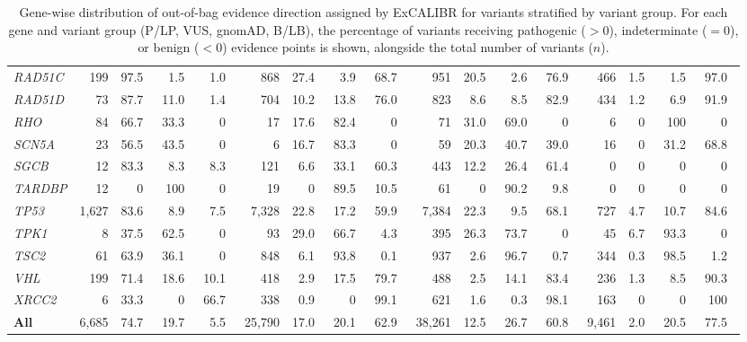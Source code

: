 \documentclass[11pt]{article}
\theoremstyle{plain}
\newcommand{\excalibr}{ExCALIBR\xspace}
\begin{document}
\begin{table}[!htb]
{{\begin{tabular}{@{}l rrrr rrrr rrrr rrrr@{}}
\textit{RAD51C} & 199 & 97.5\ & 1.5\ & 1.0\ & 868 & 27.4\ & 3.9\ & 68.7\ & 951 & 20.5\ & 2.6\ & 76.9\ & 466 & 1.5\ & 1.5\ & 97.0\ \\
\textit{RAD51D} & 73 & 87.7\ & 11.0\ & 1.4\ & 704 & 10.2\ & 13.8\ & 76.0\ & 823 & 8.6\ & 8.5\ & 82.9\ & 434 & 1.2\ & 6.9\ & 91.9\ \\
\textit{RHO} & 84 & 66.7\ & 33.3\ & 0\ & 17 & 17.6\ & 82.4\ & 0\ & 71 & 31.0\ & 69.0\ & 0\ & 6 & 0\ & 100\ & 0\ \\
\textit{SCN5A} & 23 & 56.5\ & 43.5\ & 0\ & 6 & 16.7\ & 83.3\ & 0\ & 59 & 20.3\ & 40.7\ & 39.0\ & 16 & 0\ & 31.2\ & 68.8\ \\
\textit{SGCB} & 12 & 83.3\ & 8.3\ & 8.3\ & 121 & 6.6\ & 33.1\ & 60.3\ & 443 & 12.2\ & 26.4\ & 61.4\ & 0 & 0\ & 0\ & 0\ \\
\textit{TARDBP} & 12 & 0\ & 100\ & 0\ & 19 & 0\ & 89.5\ & 10.5\ & 61 & 0\ & 90.2\ & 9.8\ & 0 & 0\ & 0\ & 0\ \\
\textit{TP53} & 1,627 & 83.6\ & 8.9\ & 7.5\ & 7,328 & 22.8\ & 17.2\ & 59.9\ & 7,384 & 22.3\ & 9.5\ & 68.1\ & 727 & 4.7\ & 10.7\ & 84.6\ \\
\textit{TPK1} & 8 & 37.5\ & 62.5\ & 0\ & 93 & 29.0\ & 66.7\ & 4.3\ & 395 & 26.3\ & 73.7\ & 0\ & 45 & 6.7\ & 93.3\ & 0\ \\
\textit{TSC2} & 61 & 63.9\ & 36.1\ & 0\ & 848 & 6.1\ & 93.8\ & 0.1\ & 937 & 2.6\ & 96.7\ & 0.7\ & 344 & 0.3\ & 98.5\ & 1.2\ \\
\textit{VHL} & 199 & 71.4\ & 18.6\ & 10.1\ & 418 & 2.9\ & 17.5\ & 79.7\ & 488 & 2.5\ & 14.1\ & 83.4\ & 236 & 1.3\ & 8.5\ & 90.3\ \\
\textit{XRCC2} & 6 & 33.3\ & 0\ & 66.7\ & 338 & 0.9\ & 0\ & 99.1\ & 621 & 1.6\ & 0.3\ & 98.1\ & 163 & 0\ & 0\ & 100\ \\
\midrule
\textbf{All} & 6,685 & 74.7\ & 19.7\ & 5.5\ & 25,790 & 17.0\ & 20.1\ & 62.9\ & 38,261 & 12.5\ & 26.7\ & 60.8\ & 9,461 & 2.0\ & 20.5\ & 77.5\ \\
\bottomrule
\end{tabular}}
}
\caption{Gene-wise distribution of out-of-bag evidence direction assigned by \excalibr for variants stratified by variant group. For each gene and variant group (P/LP, VUS, gnomAD, B/LB), the percentage of variants receiving pathogenic ($>0$), indeterminate ($=0$), or benign ($<0$) evidence points is shown, alongside the total number of variants ($n$).}
\label{tab:gene_evidence_distr_clinvar}
\end{table}
\end{document}
